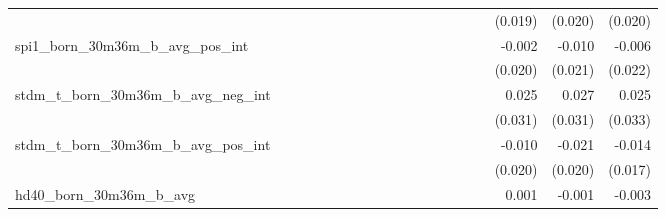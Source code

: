 \begin{tabular}{lrrrrrrrrrrrrrrrrrr}
                                            &              &              &              &              &              &              &              &              &               &              &              &               &              &              &               &      (0.019) &      (0.020) &       (0.020) \\ 
spi1\_born\_30m36m\_b\_avg\_pos\_int        &              &              &              &              &              &              &              &              &               &              &              &               &              &              &               &       -0.002 &       -0.010 &        -0.006 \\ 
                                            &              &              &              &              &              &              &              &              &               &              &              &               &              &              &               &      (0.020) &      (0.021) &       (0.022) \\ 
stdm\_t\_born\_30m36m\_b\_avg\_neg\_int     &              &              &              &              &              &              &              &              &               &              &              &               &              &              &               &        0.025 &        0.027 &         0.025 \\ 
                                            &              &              &              &              &              &              &              &              &               &              &              &               &              &              &               &      (0.031) &      (0.031) &       (0.033) \\ 
stdm\_t\_born\_30m36m\_b\_avg\_pos\_int     &              &              &              &              &              &              &              &              &               &              &              &               &              &              &               &       -0.010 &       -0.021 &        -0.014 \\ 
                                            &              &              &              &              &              &              &              &              &               &              &              &               &              &              &               &      (0.020) &      (0.020) &       (0.017) \\ 
hd40\_born\_30m36m\_b\_avg                  &              &              &              &              &              &              &              &              &               &              &              &               &              &              &               &        0.001 &       -0.001 &        -0.003 \\ 

\end{tabular}
